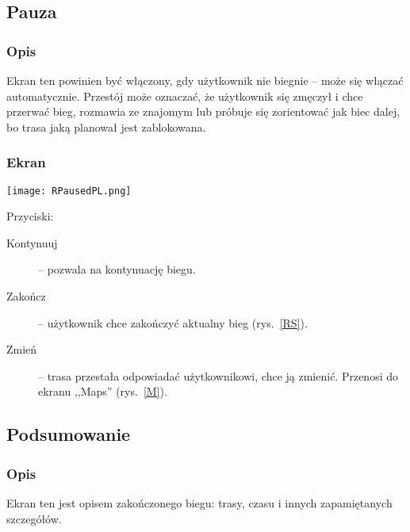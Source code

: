 \subsection{Pauza}
\subsubsection{Opis}
\noindent Ekran ten powinien być włączony, gdy użytkownik nie biegnie -- może się włączać automatycznie. Przestój może oznaczać, że użytkownik się zmęczył i chce przerwać bieg, rozmawia ze znajomym lub próbuje się zorientować jak biec dalej, bo trasa jaką planował jest zablokowana.
\subsubsection{Ekran}
\begin{minipage}{0.5\textwidth}
  \label{RP}
  \texttt{[image: RPausedPL.png]}
\end{minipage}
\begin{minipage}{0.5\textwidth}
Przyciski:\\
\begin{description}
  \item[Kontynuuj] -- pozwala na kontynuację biegu.
  \item[Zakończ] -- użytkownik chce zakończyć aktualny bieg (rys.~\ref{RS}).
  \item[Zmień] -- trasa przestała odpowiadać użytkownikowi, chce ją zmienić. Przenosi do ekranu ,,Maps'' (rys.~\ref{M}).
\end{description}
\end{minipage}
\subsection{Podsumowanie}
\subsubsection{Opis}
\noindent Ekran ten jest opisem zakończonego biegu: trasy, czasu i innych zapamiętanych szczegółów.
